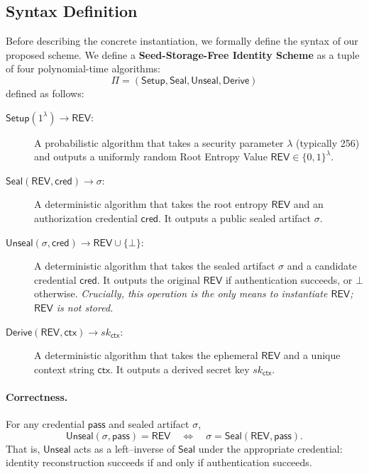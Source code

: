 \documentclass[12pt,a4paper]{article}
\begin{document}
  \subsection{Syntax Definition}

  Before describing the concrete instantiation, we formally define the syntax of our proposed scheme.
  We define a \textbf{Seed-Storage-Free Identity Scheme} as a tuple of four polynomial-time algorithms:
  \[
   \Pi = (\mathsf{Setup}, \mathsf{Seal}, \mathsf{Unseal}, \mathsf{Derive})
  \]
  defined as follows:

  \begin{description}
   \item[$\mathsf{Setup}(1^\lambda) \to \mathsf{REV}$:]
   A probabilistic algorithm that takes a security parameter $\lambda$ (typically 256) and outputs a uniformly random Root Entropy Value $\mathsf{REV} \in \{0,1\}^\lambda$.

   \item[$\mathsf{Seal}(\mathsf{REV}, \mathsf{cred}) \to \sigma$:]
   A deterministic algorithm that takes the root entropy $\mathsf{REV}$ and an authorization credential $\mathsf{cred}$. It outputs a public sealed artifact $\sigma$.

   \item[$\mathsf{Unseal}(\sigma, \mathsf{cred}) \to \mathsf{REV} \cup \{\bot\}$:]
   A deterministic algorithm that takes the sealed artifact $\sigma$ and a candidate credential $\mathsf{cred}$. It outputs the original $\mathsf{REV}$ if authentication succeeds, or $\bot$ otherwise.
   \emph{Crucially, this operation is the only means to instantiate $\mathsf{REV}$; $\mathsf{REV}$ is not stored.}

   \item[$\mathsf{Derive}(\mathsf{REV}, \mathsf{ctx}) \to sk_{\mathsf{ctx}}$:]
   A deterministic algorithm that takes the ephemeral $\mathsf{REV}$ and a unique context string $\mathsf{ctx}$. It outputs a derived secret key $sk_{\mathsf{ctx}}$.
  \end{description}

  \vspace{0.5em}
  \paragraph{Correctness.}
  For any credential $\mathsf{pass}$ and sealed artifact $\sigma$,
  \[
   \mathsf{Unseal}(\sigma,\mathsf{pass}) = \mathsf{REV}
   \quad \Longleftrightarrow \quad
   \sigma = \mathsf{Seal}(\mathsf{REV},\mathsf{pass}).
  \]
  That is, $\mathsf{Unseal}$ acts as a left--inverse of $\mathsf{Seal}$ under
  the appropriate credential: identity reconstruction succeeds if and only if
  authentication succeeds.
  \vspace{0.5em}
\end{document}
